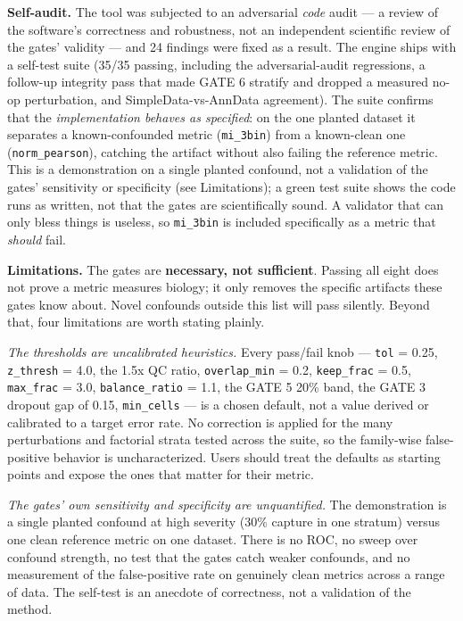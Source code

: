 \documentclass[
  11pt,
]{article}
\begin{document}
\textbf{Self-audit.} The tool was subjected to an adversarial
\emph{code} audit --- a review of the software's correctness and
robustness, not an independent scientific review of the gates' validity
--- and 24 findings were fixed as a result. The engine ships with a
self-test suite (35/35 passing, including the adversarial-audit
regressions, a follow-up integrity pass that made GATE 6 stratify and
dropped a measured no-op perturbation, and SimpleData-vs-AnnData
agreement). The suite confirms that the \emph{implementation behaves as
specified}: on the one planted dataset it separates a known-confounded
metric (\texttt{mi\_3bin}) from a known-clean one
(\texttt{norm\_pearson}), catching the artifact without also failing the
reference metric. This is a demonstration on a single planted confound,
not a validation of the gates' sensitivity or specificity (see
Limitations); a green test suite shows the code runs as written, not
that the gates are scientifically sound. A validator that can only bless
things is useless, so \texttt{mi\_3bin} is included specifically as a
metric that \emph{should} fail.

\textbf{Limitations.} The gates are \textbf{necessary, not sufficient}.
Passing all eight does not prove a metric measures biology; it only
removes the specific artifacts these gates know about. Novel confounds
outside this list will pass silently. Beyond that, four limitations are
worth stating plainly.

\emph{The thresholds are uncalibrated heuristics.} Every pass/fail knob
--- \texttt{tol} = 0.25, \texttt{z\_thresh} = 4.0, the 1.5x QC ratio,
\texttt{overlap\_min} = 0.2, \texttt{keep\_frac} = 0.5,
\texttt{max\_frac} = 3.0, \texttt{balance\_ratio} = 1.1, the GATE 5 20\%
band, the GATE 3 dropout gap of 0.15, \texttt{min\_cells} --- is a
chosen default, not a value derived or calibrated to a target error
rate. No correction is applied for the many perturbations and factorial
strata tested across the suite, so the family-wise false-positive
behavior is uncharacterized. Users should treat the defaults as starting
points and expose the ones that matter for their metric.

\emph{The gates' own sensitivity and specificity are unquantified.} The
demonstration is a single planted confound at high severity (30\%
capture in one stratum) versus one clean reference metric on one
dataset. There is no ROC, no sweep over confound strength, no test that
the gates catch weaker confounds, and no measurement of the
false-positive rate on genuinely clean metrics across a range of data.
The self-test is an anecdote of correctness, not a validation of the
method.
\end{document}
